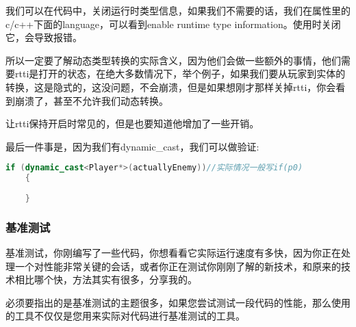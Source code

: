 我们可以在代码中，关闭运行时类型信息，如果我们不需要的话，我们在属性里的c/c++下面的language，可以看到enable runtime type information。使用时关闭它，会导致报错。

所以一定要了解动态类型转换的实际含义，因为他们会做一些额外的事情，他们需要rtti是打开的状态，在绝大多数情况下，举个例子，如果我们要从玩家到实体的转换，这是隐式的，这没问题，不会崩溃，但是如果想刚才那样关掉rtti，你会看到崩溃了，甚至不允许我们动态转换。

让rtti保持开启时常见的，但是也要知道他增加了一些开销。

最后一件事是，因为我们有dynamic_cast，我们可以做验证:
\begin{lstlisting}[language=c++]
    if (dynamic_cast<Player*>(actuallyEnemy))//实际情况一般写if(p0)
    {
        
    }
\end{lstlisting}


\subsubsection{基准测试}


基准测试，你刚编写了一些代码，你想看看它实际运行速度有多快，因为你正在处理一个对性能非常关键的会话，或者你正在测试你刚刚了解的新技术，和原来的技术相比哪个快，方法其实有很多，分享我的。

必须要指出的是基准测试的主题很多，如果您尝试测试一段代码的性能，那么使用的工具不仅仅是您用来实际对代码进行基准测试的工具。


